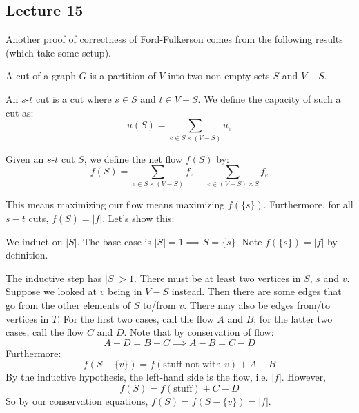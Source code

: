 \subsection{Lecture 15}

Another proof of correctness of Ford-Fulkerson comes from the following results (which take some setup).

\begin{definition}
    A cut of a graph $G$ is a partition of $V$ into two non-empty sets $S$ and $V - S$.
\end{definition}

\begin{definition}
    An $s$-$t$ cut is a cut where $s \in S$ and $t \in V - S$.
    We define the capacity of such a cut as:
    \[ u(S) = \sum_{e \in S \times (V - S)} u_e \]
\end{definition}

\begin{definition}
    Given an $s$-$t$ cut $S$, we define the net flow $f(S)$ by:
    \[ f(S) = \sum_{e \in S \times (V - S)} f_e - \sum_{e \in (V - S) \times S} f_e \]
\end{definition}

This means maximizing our flow means maximizing $f(\{s\})$. Furthermore,
for all $s-t$ cuts, $f(S) = |f|$. Let's show this:

\begin{proof*}
    We induct on $|S|$. The base case is $|S| = 1 \implies S = \{s\}$. Note $f(\{s\}) = |f|$ by definition.

    The inductive step has $|S| > 1$. There must be at least two vertices in $S$, $s$ and $v$. Suppose we looked
    at $v$ being in $V - S$ instead. Then there are some edges that go from the other elements of $S$ to/from $v$.
    There may also be edges from/to vertices in $T$. For the first two cases, call the flow $A$ and $B$; for the latter two cases,
    call the flow $C$ and $D$. Note that by conservation of flow:
    \[ A + D = B + C \implies A - B = C - D \]
    Furthermore:
    \[ f(S - \{v\}) = f(\text{stuff not with $v$}) + A - B \]
    By the inductive hypothesis, the left-hand side is the flow, i.e. $|f|$.
    However,
    \[ f(S) = f(\text{stuff}) + C - D \]
    So by our conservation equations, $f(S) = f(S - \{v\}) = |f|$.
\end{proof*}

